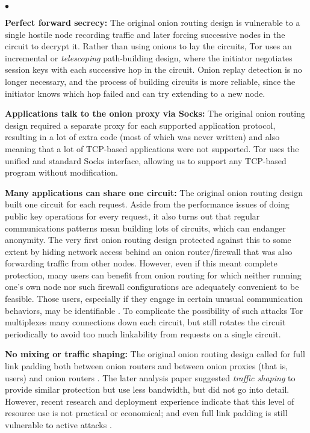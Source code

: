 \documentclass[times,10pt,twocolumn]{article}
\newenvironment{tightlist}{\begin{list}{$\bullet$}{
  \setlength{\itemsep}{0mm}
    \setlength{\parsep}{0mm}
    }}{\end{list}}
\begin{document}
\begin{tightlist}

\item \textbf{Perfect forward secrecy:} The original onion routing
design is vulnerable to a single hostile node recording traffic and later
forcing successive nodes in the circuit to decrypt it. Rather than using
onions to lay the circuits, Tor uses an incremental or \emph{telescoping}
path-building design, where the initiator negotiates session keys with
each successive hop in the circuit. Onion replay detection is no longer
necessary, and the process of building circuits is more reliable, since
the initiator knows which hop failed and can try extending to a new node.

\item \textbf{Applications talk to the onion proxy via Socks:}
The original onion routing design required a separate proxy for each
supported application protocol, resulting in a lot of extra code (most
of which was never written) and also meaning that a lot of TCP-based
applications were not supported. Tor uses the unified and standard Socks
\cite{socks4,socks5} interface, allowing us to support any TCP-based
program without modification.

\item \textbf{Many applications can share one circuit:} The original
onion routing design built one circuit for each request. Aside from the
performance issues of doing public key operations for every request, it
also turns out that regular communications patterns mean building lots
of circuits, which can endanger anonymity.
The very first onion routing design \cite{or-ih96} protected against
this to some extent by hiding network access behind an onion
router/firewall that was also forwarding traffic from other nodes.
However, even if this meant complete protection, many users can
benefit from onion routing for which neither running one's own node
nor such firewall configurations are adequately convenient to be
feasible. Those users, especially if they engage in certain unusual
communication behaviors, may be identifiable \cite{wright03}. To
complicate the possibility of such attacks Tor multiplexes many
connections down each circuit, but still rotates the circuit
periodically to avoid too much linkability from requests on a single
circuit.

\item \textbf{No mixing or traffic shaping:} The original onion routing
design called for full link padding both between onion routers and between
onion proxies (that is, users) and onion routers \cite{or-jsac98}. The
later analysis paper \cite{or-pet00} suggested \emph{traffic shaping}
to provide similar protection but use less bandwidth, but did not go
into detail. However, recent research \cite{econymics} and deployment
experience \cite{freedom21-security} indicate that this level of resource
use is not practical or economical; and even full link padding is still
vulnerable to active attacks \cite{defensive-dropping}.


\end{tightlist}
\end{document}
